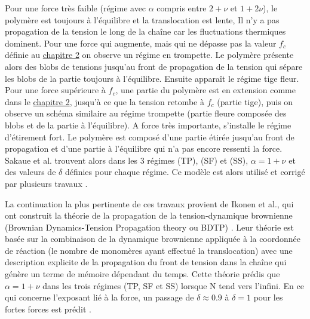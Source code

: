   Pour une force très faible (régime avec $\alpha$ compris entre $2+\nu$ et $1+2\nu$), le polymère est toujours à l'équilibre et la translocation est lente, Il n'y a pas propagation de la tension le long de la chaîne car les fluctuations thermiques dominent. Pour une force qui augmente, mais qui ne dépasse pas la valeur $f_c$ définie au \hyperref[fc]{chapitre 2} on observe un régime en trompette. Le polymère présente alors des blobs de tensions jusqu'au front de propagation de la tension qui sépare les blobs de la partie toujours à l'équilibre. Ensuite apparaît le régime tige fleur. Pour une force supérieure à $f_c$, une partie du polymère est en extension comme dans le \hyperref[fc]{chapitre 2}, jusqu'à ce que la tension retombe à $f_c$ (partie tige), puis on observe un schéma similaire au régime trompette (partie fleure composée des blobs et de la partie à l'équilibre). A force très importante, s’installe le régime d'étirement fort. Le polymère est composé d'une partie étirée jusqu'au front de propagation et d'une partie à l'équilibre qui n'a pas encore ressenti la force. Sakaue et al.\cite{Saito2011} trouvent alors dans les 3 régimes (TP), (SF) et (SS), $\alpha=1+\nu$ et des valeurs de $\delta$ définies pour chaque régime. Ce modèle est alors utilisé et corrigé par plusieurs travaux \cite{Ambjrnsson2005,2Ambjrnsson2005,Rowghanian2011,Dubbeldam2012}. 
  
  
La continuation la plus pertinente de ces travaux provient de Ikonen et al., qui ont construit la théorie de la propagation de la tension-dynamique brownienne  (Brownian Dynamics-Tension Propagation theory ou BDTP) \cite{Ikonen2012,2Ikonen2012,Ikonen2013}. Leur théorie est basée sur la combinaison de la dynamique brownienne appliquée à la coordonnée de réaction (le nombre de monomères ayant effectué la translocation) avec une description explicite de la propagation du front de tension dans la chaîne qui génère un terme de mémoire dépendant du temps. Cette théorie prédis que $\alpha=1+\nu$ dans les trois régimes (TP, SF et SS) lorsque N tend vers l'infini. En ce qui concerne l'exposant lié à la force, un passage de $\delta \approx 0.9$ à $\delta=1$ pour les fortes forces est prédit \cite{Ikonen2013}.

